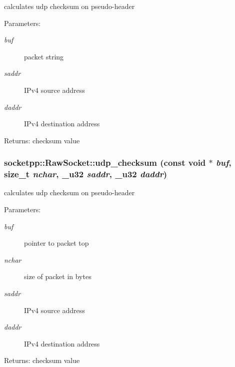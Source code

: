 calculates udp checksum on pseudo-header 

\begin{Desc}
\item[Parameters:]
\begin{description}
\item[{\em buf}]packet string \item[{\em saddr}]IPv4 source address \item[{\em daddr}]IPv4 destination address \end{description}
\end{Desc}
\begin{Desc}
\item[Returns:]checksum value \end{Desc}
\hypertarget{classsocketpp_1_1RawSocket_25eef0a35fc66b33bed3abd176a5175e}{
\subsubsection[{udp\_\-checksum}]{ socketpp::RawSocket::udp\_\-checksum (const void $\ast$ {\em buf}, \/  size\_\-t {\em nchar}, \/  {\bf \_\-u32} {\em saddr}, \/  {\bf \_\-u32} {\em daddr})}}
\label{classsocketpp_1_1RawSocket_25eef0a35fc66b33bed3abd176a5175e}


calculates udp checksum on pseudo-header 

\begin{Desc}
\item[Parameters:]
\begin{description}
\item[{\em buf}]pointer to packet top \item[{\em nchar}]size of packet in bytes \item[{\em saddr}]IPv4 source address \item[{\em daddr}]IPv4 destination address \end{description}
\end{Desc}
\begin{Desc}
\item[Returns:]checksum value \end{Desc}



